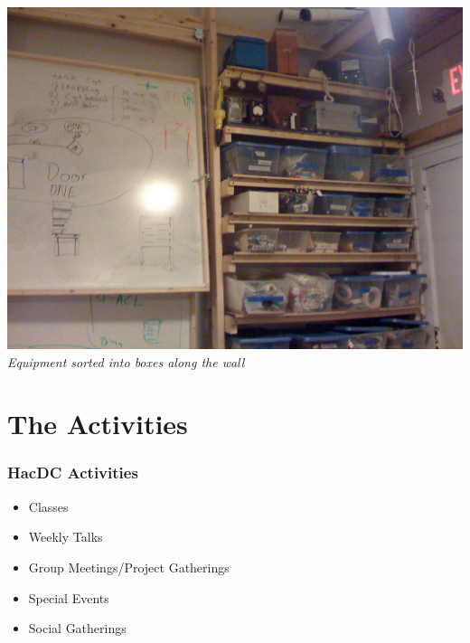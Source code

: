 \documentclass[notes]{beamer}
\begin{document}
\begin{frame}
    \begin{center}
    \includegraphics[height=.8\textheight]{equipment.jpg} \\
    {\small{\em Equipment sorted into boxes along the wall}}
  \end{center}
\end{frame}

\section{The Activities}

\begin{frame}
  \frametitle{HacDC Activities}
  \begin{itemize}
  \item Classes
  \item Weekly Talks
  \item Group Meetings/Project Gatherings
  \item Special Events
   \item Social Gatherings
   \end{itemize}
\end{frame}
\end{document}
